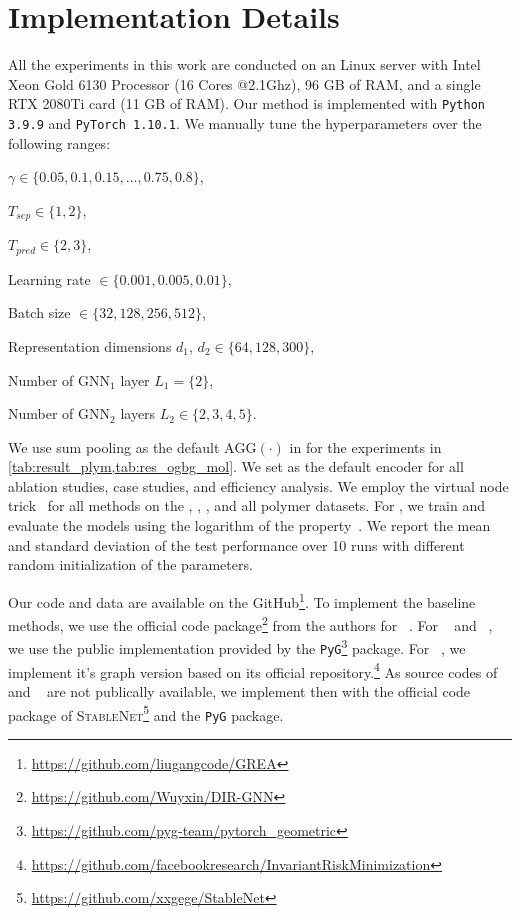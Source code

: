 \documentclass[sigconf]{acmart}
\begin{document}
\section{Implementation Details}
\label{sec:details}

All the experiments in this work are conducted on an Linux server with Intel Xeon Gold 6130 Processor (16 Cores @2.1Ghz), 96 GB of RAM, and a single RTX 2080Ti card (11 GB of RAM). Our method is implemented with \verb+Python 3.9.9+ and \verb+PyTorch 1.10.1+. We manually tune the hyperparameters over the following ranges:
\begin{compactitem}
\item $\gamma \in \{0.05, 0.1, 0.15, \dots, 0.75, 0.8\}$,
\item $T_{sep} \in \{1,2\}$,
\item $T_{pred} \in \{2,3\}$,
\item Learning rate $\in \{0.001, 0.005, 0.01\}$,
\item Batch size $\in \{32, 128, 256, 512\}$,
\item Representation dimensions $d_1$, $d_2 \in \{64, 128, 300\}$,
\item Number of GNN$_1$ layer $L_1=\{2\}$,
\item Number of GNN$_2$ layers $L_2 \in \{2,3,4,5\}$.
\end{compactitem}
We use sum pooling as the default $\text{AGG}(\cdot)$ in \method for the experiments in \cref{tab:result_plym,tab:res_ogbg_mol}. We set \gin as the default encoder for all ablation studies, case studies, and efficiency analysis.
We employ the virtual node trick~\cite{hu2020open} for all methods on the \hiv, \toxt, \bbbp, and all polymer datasets. For \density, we train and evaluate the models using the logarithm of the property~\cite{ma2020pi1m}.
We report the mean and standard deviation of the test performance over 10 runs with different random initialization of the parameters. 

Our code and data are available on the GitHub\footnote{\url{https://github.com/liugangcode/GREA}}. To implement the baseline methods, we use the official code package\footnote{\url{https://github.com/Wuyxin/DIR-GNN}} from the authors for \dir~\citep{wu2022discovering}. For \unets~\cite{gao2021graph} and \selfattn~\cite{lee2019self}, we use the public implementation provided by the \verb+PyG+\footnote{\url{https://github.com/pyg-team/pytorch_geometric}} package. For \irm~\citep{arjovsky2019invariant}, we implement it's graph version based on its official repository.\footnote{\url{https://github.com/facebookresearch/InvariantRiskMinimization}}
As source codes of \oodgnn~\cite{li2021ood} and \stablegnn~\cite{fan2021generalizing} are not publically available, we implement then with the official code package of \textsc{StableNet}\footnote{\url{https://github.com/xxgege/StableNet}} and the \verb+PyG+ package. 
\end{document}
